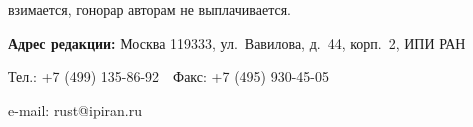 {{\begin{enumerate}
взимается, гонорар авторам не выплачивается.  


\end{enumerate}





\thispagestyle{empty}


\textbf{Адрес редакции:} Москва 119333, ул.~Вавилова, д.~44, корп.~2, ИПИ РАН





Тел.: +7 (499) 135-86-92\ \ Факс:  +7 (495) 930-45-05\ \  


e-mail:   rust@ipiran.ru }


}















 


